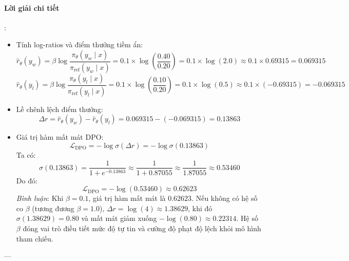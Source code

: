 \paragraph{Lời giải chi tiết}:
\begin{itemize}
  \item[1)] Tính log-ratios và điểm thưởng tiềm ẩn:
  \begin{equation*}
  \hat{r}_\theta(y_w) = \beta \log \frac{\pi_\theta(y_w \mid x)}{\pi_{\text{ref}}(y_w \mid x)} = 0.1 \times \log \left(\frac{0.40}{0.20}\right) = 0.1 \times \log(2.0) \approx 0.1 \times 0.69315 = 0.069315
  \end{equation*}
  \begin{equation*}
  \hat{r}_\theta(y_l) = \beta \log \frac{\pi_\theta(y_l \mid x)}{\pi_{\text{ref}}(y_l \mid x)} = 0.1 \times \log \left(\frac{0.10}{0.20}\right) = 0.1 \times \log(0.5) \approx 0.1 \times (-0.69315) = -0.069315
  \end{equation*}

  \item[2)] Lề chênh lệch điểm thưởng:
  \begin{equation*}
  \Delta r = \hat{r}_\theta(y_w) - \hat{r}_\theta(y_l) = 0.069315 - (-0.069315) = 0.13863
  \end{equation*}

  \item[3)] Giá trị hàm mất mát DPO:
  \begin{equation*}
  \mathcal{L}_{\text{DPO}} = -\log \sigma\left( \Delta r \right) = -\log \sigma\left( 0.13863 \right)
  \end{equation*}
  Ta có:
  \begin{equation*}
  \sigma(0.13863) = \frac{1}{1 + e^{-0.13863}} \approx \frac{1}{1 + 0.87055} \approx \frac{1}{1.87055} \approx 0.53460
  \end{equation*}
  Do đó:
  \begin{equation*}
  \mathcal{L}_{\text{DPO}} = -\log(0.53460) \approx 0.62623
  \end{equation*}
  \textit{Bình luận}: Khi $\beta = 0.1$, giá trị hàm mất mát là $0.62623$. Nếu không có hệ số co $\beta$ (tương đương $\beta = 1.0$), $\Delta r = \log(4) \approx 1.38629$, khi đó $\sigma(1.38629) = 0.80$ và mất mát giảm xuống $-\log(0.80) \approx 0.22314$. Hệ số $\beta$ đóng vai trò điều tiết mức độ tự tin và cường độ phạt độ lệch khỏi mô hình tham chiếu.
\end{itemize}

---

